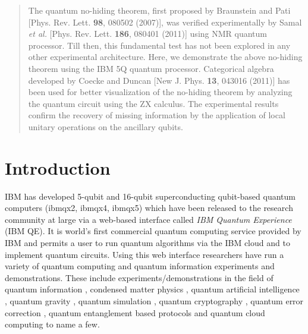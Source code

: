 \date{Received: date / Accepted: date}

\maketitle

\begin{abstract}
The quantum no-hiding theorem, first proposed by Braunstein and Pati [Phys. Rev. Lett. \textbf{98}, 080502 (2007)], was verified experimentally by Samal \emph{et al.} [Phys. Rev. Lett. \textbf{186}, 080401 (2011)] using NMR quantum processor. Till then, this fundamental test has not been explored in any other experimental architecture. Here, we demonstrate the above no-hiding theorem using the IBM 5Q quantum processor. Categorical algebra developed by Coecke and Duncan [New J. Phys. \textbf{13}, 043016 (2011)] has been used for better visualization of the no-hiding theorem by analyzing the quantum circuit using the ZX calculus. The experimental results confirm the recovery of missing information by the application of local unitary operations on the ancillary qubits. 
\end{abstract}


\section{Introduction}
IBM has developed 5-qubit and 16-qubit superconducting qubit-based quantum computers (ibmqx2, ibmqx4, ibmqx5) which have been released to the research community at large via a web-based interface called \textit{IBM Quantum Experience} \cite{qnoh_IBM} (IBM QE). It is world's first commercial quantum computing service provided by IBM and permits a user to run quantum algorithms via the IBM cloud and to implement quantum circuits. Using this web interface researchers have run a variety of quantum computing and quantum information experiments and demonstrations. These include experiments/demonstrations in the field of quantum information \cite{qnoh_LeggetIBM,qnoh_MerminIBM}, condensed matter physics \cite{qnoh_cond1,qnoh_cond2}, quantum artificial intelligence \cite{qnoh_ai1}, quantum gravity \cite{qnoh_qg1}, quantum simulation \cite{npjQIViyuela2018,qnoh_qg2}, quantum cryptography \cite{qnoh_BeheraQIP2017,qnoh_RGBiswas2018}, quantum error correction \cite{qnoh_WoottonIBM,qnoh_Bikash3,qnoh_VuillotQIC2018,qnoh_arXivHarper2018}, quantum entanglement based protocols \cite{qnoh_SisodiaQIP2017,qnoh_Anirban,qnoh_Abhishek,qnoh_EntropicIBM,qnoh_Bikash2} and quantum cloud computing \cite{qnoh_CloudIBM,qnoh_LinkeIBM} to name a few.  

